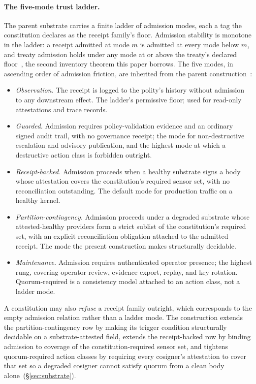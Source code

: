 \paragraph{The five-mode trust ladder.}
The parent substrate carries a finite ladder of admission modes, each a tag the constitution declares as the receipt family's floor. Admission stability is monotone in the ladder: a receipt admitted at mode $m$ is admitted at every mode below $m$, and treaty admission holds under any mode at or above the treaty's declared floor~, the second inventory theorem this paper borrows. The five modes, in ascending order of admission friction, are inherited from the parent construction~\cite{chioProgrammableSovereignty2027}:
\begin{itemize}
  \item \emph{Observation.} The receipt is logged to the polity's history without admission to any downstream effect. The ladder's permissive floor; used for read-only attestations and trace records.
  \item \emph{Guarded.} Admission requires policy-validation evidence and an ordinary signed audit trail, with no governance receipt; the mode for non-destructive escalation and advisory publication, and the highest mode at which a destructive action class is forbidden outright.
  \item \emph{Receipt-backed.} Admission proceeds when a healthy substrate signs a body whose attestation covers the constitution's required sensor set, with no reconciliation outstanding. The default mode for production traffic on a healthy kernel.
  \item \emph{Partition-contingency.} Admission proceeds under a degraded substrate whose attested-healthy providers form a strict sublist of the constitution's required set, with an explicit reconciliation obligation attached to the admitted receipt. The mode the present construction makes structurally decidable.
  \item \emph{Maintenance.} Admission requires authenticated operator presence; the highest rung, covering operator review, evidence export, replay, and key rotation. Quorum-required is a consistency model attached to an action class, not a ladder mode.
\end{itemize}
A constitution may also \emph{refuse} a receipt family outright, which corresponds to the empty admission relation rather than a ladder mode. The construction extends the partition-contingency row by making its trigger condition structurally decidable on a substrate-attested field, extends the receipt-backed row by binding admission to coverage of the constitution-required sensor set, and tightens quorum-required action classes by requiring every cosigner's attestation to cover that set so a degraded cosigner cannot satisfy quorum from a clean body alone~(\S\ref{sec:substrate}).

